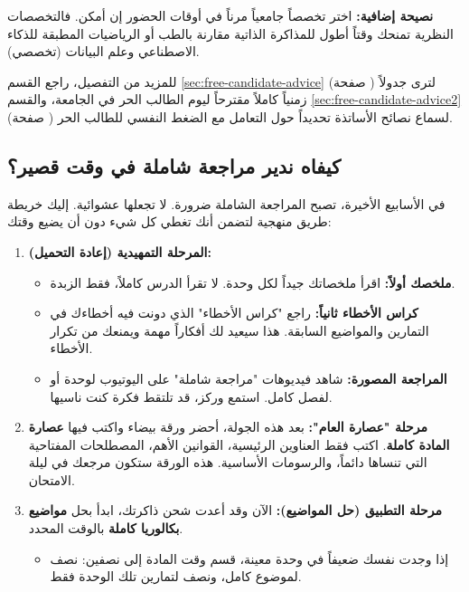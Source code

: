 \documentclass[12pt,a4paper]{book}
\begin{document}
	\textbf{نصيحة إضافية:} اختر تخصصاً جامعياً مرناً في أوقات الحضور إن أمكن. فالتخصصات النظرية تمنحك وقتاً أطول للمذاكرة الذاتية مقارنة بالطب أو الرياضيات المطبقة للذكاء الاصطناعي وعلم البيانات (تخصصي).
	
	للمزيد من التفصيل، راجع القسم \ref{sec:free-candidate-advice} (صفحة \pageref{sec:free-candidate-advice}) لترى جدولاً زمنياً كاملاً مقترحاً ليوم الطالب الحر في الجامعة، والقسم \ref{sec:free-candidate-advice2} (صفحة \pageref{sec:free-candidate-advice2}) لسماع نصائح الأساتذة تحديداً حول التعامل مع الضغط النفسي للطالب الحر.
	
	\subsection{كيفاه ندير مراجعة شاملة في وقت قصير؟}
	\label{sec:comprehensive-review}
	
	في الأسابيع الأخيرة، تصبح المراجعة الشاملة ضرورة. لا تجعلها عشوائية. إليك خريطة طريق منهجية لتضمن أنك تغطي كل شيء دون أن يضيع وقتك:
	
	\begin{enumerate}
		\item \textbf{المرحلة التمهيدية (إعادة التحميل):}
		\begin{itemize}
			\item \textbf{ملخصك أولاً:} اقرأ ملخصاتك جيداً لكل وحدة. لا تقرأ الدرس كاملاً، فقط الزبدة.
			\item \textbf{كراس الأخطاء ثانياً:} راجع "كراس الأخطاء" الذي دونت فيه أخطاءك في التمارين والمواضيع السابقة. هذا سيعيد لك أفكاراً مهمة ويمنعك من تكرار الأخطاء.
			\item \textbf{المراجعة المصورة:} شاهد فيديوهات "مراجعة شاملة" على اليوتيوب لوحدة أو لفصل كامل. استمع وركز، قد تلتقط فكرة كنت ناسيها.
		\end{itemize}
		\item \textbf{مرحلة "عصارة العام":}
		بعد هذه الجولة، أحضر ورقة بيضاء واكتب فيها \textbf{عصارة المادة كاملة}. اكتب فقط العناوين الرئيسية، القوانين الأهم، المصطلحات المفتاحية التي تنساها دائماً، والرسومات الأساسية. هذه الورقة ستكون مرجعك في ليلة الامتحان.
		\item \textbf{مرحلة التطبيق (حل المواضيع):}
		الآن وقد أعدت شحن ذاكرتك، ابدأ بحل \textbf{مواضيع بكالوريا كاملة} بالوقت المحدد. 
		\begin{itemize}
			\item إذا وجدت نفسك ضعيفاً في وحدة معينة، قسم وقت المادة إلى نصفين: نصف لموضوع كامل، ونصف لتمارين تلك الوحدة فقط.
		\end{itemize}
	\end{enumerate}
	
\end{document}
